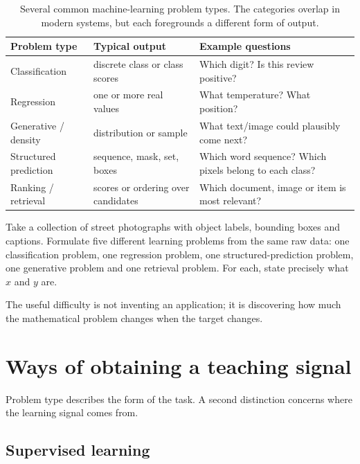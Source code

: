 \begin{table}[ht]
\centering
\small
\begin{tabular}{p{}p{}p{}}
\toprule
Problem type & Typical output & Example questions \\
\midrule
Classification & discrete class or class scores & Which digit? Is this review positive? \\
Regression & one or more real values & What temperature? What position? \\
Generative / density & distribution or sample & What text/image could plausibly come next? \\
Structured prediction & sequence, mask, set, boxes & Which word sequence? Which pixels belong to each class? \\
Ranking / retrieval & scores or ordering over candidates & Which document, image or item is most relevant? \\
\bottomrule
\end{tabular}
\caption{Several common machine-learning problem types. The categories overlap in modern systems, but each foregrounds a different form of output.}
\label{tab:week1-problem-types}
\end{table}

\begin{optionalexercise}[title={Optional exercise --- one dataset, several tasks}]
Take a collection of street photographs with object labels, bounding boxes and captions. Formulate five different learning problems from the same raw data: one classification problem, one regression problem, one structured-prediction problem, one generative problem and one retrieval problem. For each, state precisely what \(x\) and \(y\) are.

The useful difficulty is not inventing an application; it is discovering how much the mathematical problem changes when the target changes.
\end{optionalexercise}

\section{Ways of obtaining a teaching signal}

Problem type describes the form of the task. A second distinction concerns where the learning signal comes from.

\subsection{Supervised learning}

